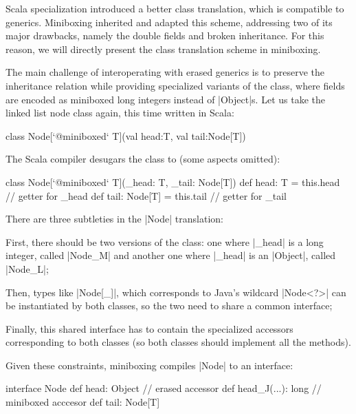 Scala specialization \cite{iuli-thesis, specialization-iuli} introduced a better class translation, which is compatible to generics. Miniboxing \cite{miniboxing} inherited and adapted this scheme, addressing two of its major drawbacks, namely the double fields and broken inheritance. For this reason, we will directly present the class translation scheme in miniboxing.

The main challenge of interoperating with erased generics is to preserve the inheritance relation while providing specialized variants of the class, where fields are encoded as miniboxed long integers instead of |Object|s. Let us take the linked list node class again, this time written in Scala:

\begin{lstlisting-nobreak}
 class Node[`@miniboxed` T](val head:T, val tail:Node[T])
\end{lstlisting-nobreak}

The Scala compiler desugars the class to (some aspects omitted):

\begin{lstlisting-nobreak}
 class Node[`@miniboxed` T](_head: T, _tail: Node[T]) {
   def head: T = this.head                 // getter for _head
   def tail: Node[T] = this.tail // getter for _tail
 }
\end{lstlisting-nobreak}

There are three subtleties in the |Node| translation:
\begin{compactitem}
  \item First, there should be two versions of the class: one where |_head| is a long integer, called |Node_M| and another one where |_head| is an |Object|, called |Node_L|;
  \item Then, types like |Node[_]|, which corresponds to Java's wildcard |Node<?>| can be instantiated by both classes, so the two need to share a common interface;
  \item Finally, this shared interface has to contain the specialized accessors corresponding to both classes (so both classes should implement all the methods).
\end{compactitem}

Given these constraints, miniboxing compiles |Node| to an interface:

\begin{lstlisting-nobreak}
 interface Node {
   def head: Object             // erased accessor
   def head_J(...): long // miniboxed acccesor
   def tail: Node[T]
 }
\end{lstlisting-nobreak}

